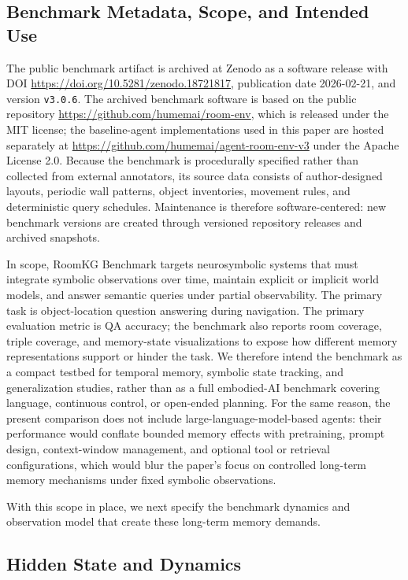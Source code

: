 \documentclass[Afour,sageh,times]{sagej}
\begin{document}
\subsection{Benchmark Metadata, Scope, and Intended Use}

The public benchmark artifact is archived at Zenodo as a software release with DOI
\url{https://doi.org/10.5281/zenodo.18721817}, publication date 2026-02-21, and version
\texttt{v3.0.6}. The archived benchmark software is based on the public repository
\url{https://github.com/humemai/room-env}, which is released under the MIT license;
the baseline-agent implementations used in this paper are hosted separately at
\url{https://github.com/humemai/agent-room-env-v3} under the Apache License 2.0.
Because the benchmark is procedurally specified rather than collected from external
annotators, its source data consists of author-designed layouts, periodic wall patterns,
object inventories, movement rules, and deterministic query schedules. Maintenance is
therefore software-centered: new benchmark versions are created through versioned
repository releases and archived snapshots.

In scope, RoomKG Benchmark targets neurosymbolic systems that must integrate symbolic
observations over time, maintain explicit or implicit world models, and answer semantic
queries under partial observability. The primary task is object-location question
answering during navigation. The primary evaluation metric is QA accuracy; the benchmark
also reports room coverage, triple coverage, and memory-state visualizations to expose
how different memory representations support or hinder the task. We therefore intend the
benchmark as a compact testbed for temporal memory, symbolic state tracking, and
generalization studies, rather than as a full embodied-AI benchmark covering language,
continuous control, or open-ended planning. For the same reason, the present comparison
does not include large-language-model-based agents: their performance would conflate
bounded memory effects with pretraining, prompt design, context-window management, and
optional tool or retrieval configurations, which would blur the paper's focus on
controlled long-term memory mechanisms under fixed symbolic observations.

With this scope in place, we next specify the benchmark dynamics and observation model
that create these long-term memory demands.

\subsection{Hidden State and Dynamics}
\end{document}
